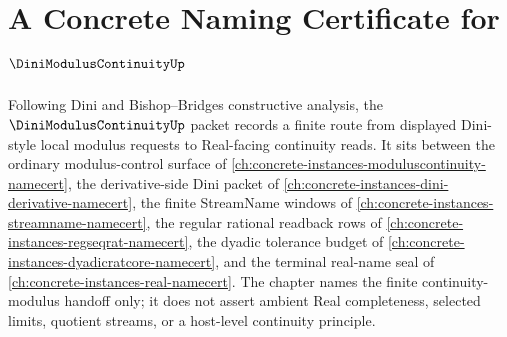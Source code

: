 \chapter{A Concrete Naming Certificate for $\DiniModulusContinuityUp$}
\label{ch:concrete-instances-dini-modulus-continuity-namecert}

Following Dini and Bishop--Bridges constructive analysis, the $\DiniModulusContinuityUp$ packet records a finite route from displayed Dini-style local modulus requests to Real-facing continuity reads. It sits between the ordinary modulus-control surface of \autoref{ch:concrete-instances-moduluscontinuity-namecert}, the derivative-side Dini packet of \autoref{ch:concrete-instances-dini-derivative-namecert}, the finite StreamName windows of \autoref{ch:concrete-instances-streamname-namecert}, the regular rational readback rows of \autoref{ch:concrete-instances-regseqrat-namecert}, the dyadic tolerance budget of \autoref{ch:concrete-instances-dyadicratcore-namecert}, and the terminal real-name seal of \autoref{ch:concrete-instances-real-namecert}. The chapter names the finite continuity-modulus handoff only; it does not assert ambient Real completeness, selected limits, quotient streams, or a host-level continuity principle.

